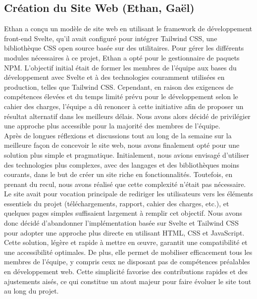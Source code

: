 \documentclass{report}
\begin{document}
\subsection*{Création du Site Web (Ethan, Gaël)}
Ethan a conçu un modèle de site web en utilisant le framework de développement front-end Svelte, qu'il avait configuré pour intégrer Tailwind CSS, une bibliothèque CSS open source basée sur des utilitaires. Pour gérer les différents modules nécessaires à ce projet, Ethan a opté pour le gestionnaire de paquets NPM. L'objectif initial était de former les membres de l'équipe aux bases du développement avec Svelte et à des technologies couramment utilisées en production, telles que Tailwind CSS. Cependant, en raison des exigences de compétences élevées et du temps limité prévu pour le développement selon le cahier des charges, l'équipe a dû renoncer à cette initiative afin de proposer un résultat alternatif dans les meilleurs délais. Nous avons alors décidé de privilégier une approche plus accessible pour la majorité des membres de l'équipe.
\\[0.4cm]
Après de longues réflexions et discussions tout au long de la semaine sur la meilleure façon de concevoir le site web, nous avons finalement opté pour une solution plus simple et pragmatique. Initialement, nous avions envisagé d’utiliser des technologies plus complexes, avec des langages et des bibliothèques moins courants, dans le but de créer un site riche en fonctionnalités. Toutefois, en prenant du recul, nous avons réalisé que cette complexité n'était pas nécessaire. Le site avait pour vocation principale de rediriger les utilisateurs vers les éléments essentiels du projet (téléchargements, rapport, cahier des charges, etc.), et quelques pages simples suffisaient largement à remplir cet objectif. Nous avons donc décidé d’abandonner l'implémentation basée sur Svelte et Tailwind CSS pour adopter une approche plus directe en utilisant HTML, CSS et JavaScript. Cette solution, légère et rapide à mettre en œuvre, garantit une compatibilité et une accessibilité optimales. De plus, elle permet de mobiliser efficacement tous les membres de l’équipe, y compris ceux ne disposant pas de compétences préalables en développement web. Cette simplicité favorise des contributions rapides et des ajustements aisés, ce qui constitue un atout majeur pour faire évoluer le site tout au long du projet.

\newpage %
\end{document}
